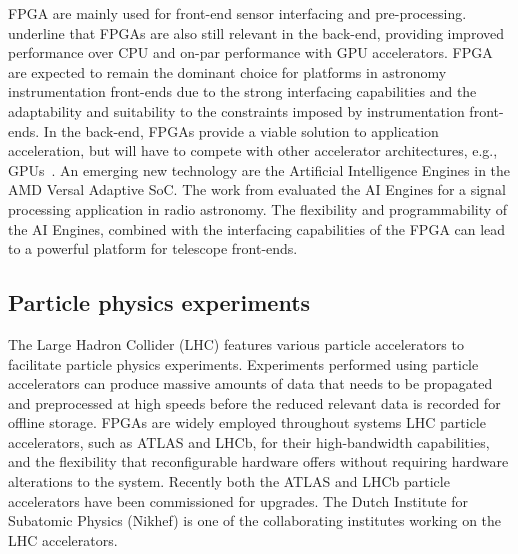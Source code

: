 \vspace{0.4cm}
FPGA are mainly used for front-end sensor interfacing and pre-processing. \citet{Corda2020NearImaging, Corda2022Reduced-PrecisionHardware} underline that FPGAs are also still relevant in the back-end, providing improved performance over CPU and on-par performance with GPU accelerators. FPGA are expected to remain the dominant choice for platforms in astronomy instrumentation front-ends due to the strong interfacing capabilities and the adaptability and suitability to the constraints imposed by instrumentation front-ends. In the back-end, FPGAs provide a viable solution to application acceleration, but will have to compete with other accelerator architectures, e.g., GPUs~\cite{10.1007/978-3-030-29400-7_36}. 
An emerging new technology are the Artificial Intelligence Engines in the AMD Versal Adaptive SoC. The work from \citet{Versal-ACAP} evaluated the AI Engines for a signal processing application in radio astronomy. The flexibility and programmability of the AI Engines, combined with the interfacing capabilities of the FPGA can lead to a powerful platform for telescope front-ends.

\subsection{Particle physics experiments}
\label{sec:phys}
The Large Hadron Collider (LHC) features various particle accelerators to facilitate particle physics experiments. Experiments performed using particle accelerators can produce massive amounts of data that needs to be propagated and preprocessed at high speeds before the reduced relevant data is recorded for offline storage. FPGAs are widely employed throughout systems LHC particle accelerators, such as ATLAS and LHCb, for their high-bandwidth capabilities, and the flexibility that reconfigurable hardware offers without requiring hardware alterations to the system. Recently both the ATLAS and LHCb particle accelerators have been commissioned for upgrades. The Dutch Institute for Subatomic Physics (Nikhef) is one of the collaborating institutes working on the LHC accelerators.


